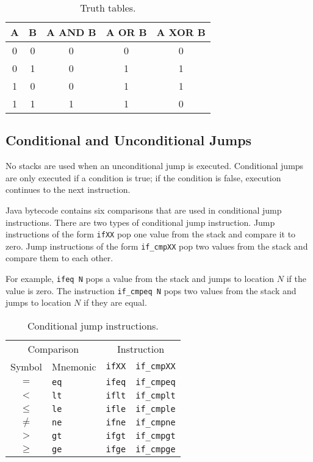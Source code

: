 \begin{table}[htp]
  \centering
  \caption*{Truth tables.}
  \begin{tabular}{ccccc}
    \toprule
    A & B & A AND B & A OR B & A XOR B \\
    \midrule
    0 & 0 & 0 & 0 & 0 \\
    0 & 1 & 0 & 1 & 1 \\
    1 & 0 & 0 & 1 & 1 \\
    1 & 1 & 1 & 1 & 0 \\
    \bottomrule
  \end{tabular}
\end{table}

\subsection{Conditional and Unconditional Jumps}

No stacks are used when an unconditional jump is executed.
Conditional jumps are only executed if a condition is true; if the condition is false, execution continues to the next instruction.

Java bytecode contains six comparisons that are used in conditional jump instructions.
There are two types of conditional jump instruction.
Jump instructions of the form \texttt{ifXX} pop one value from the stack and compare it to zero.
Jump instructions of the form \texttt{if\_cmpXX} pop two values from the stack and compare them to each other.

For example, \texttt{ifeq N} pops a value from the stack and jumps to location \( N \) if the value is zero.
The instruction \texttt{if\_cmpeq N} pops two values from the stack and jumps to location \( N \) if they are equal.

\begin{table}[htp]
  \centering
  \caption*{Conditional jump instructions.}
  \begin{tabular}{clll}
    \toprule
    \multicolumn{2}{c}{Comparison} & \multicolumn{2}{c}{Instruction} \\
    Symbol & Mnemonic & \texttt{ifXX} & \texttt{if\_cmpXX} \\
    \midrule
    \( = \)    & \texttt{eq} & \texttt{ifeq} & \texttt{if\_cmpeq} \\
    \( < \)    & \texttt{lt} & \texttt{iflt} & \texttt{if\_cmplt} \\
    \( \leq \) & \texttt{le} & \texttt{ifle} & \texttt{if\_cmple} \\
    \( \neq \) & \texttt{ne} & \texttt{ifne} & \texttt{if\_cmpne} \\
    \( > \)    & \texttt{gt} & \texttt{ifgt} & \texttt{if\_cmpgt} \\
    \( \geq \) & \texttt{ge} & \texttt{ifge} & \texttt{if\_cmpge} \\
    \bottomrule
  \end{tabular}
\end{table}
